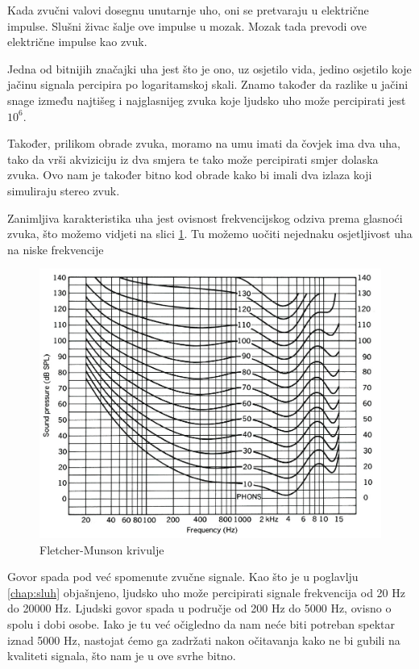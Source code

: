 \documentclass[times, utf8, diplomski]{fer}
\begin{document}
Kada zvučni valovi dosegnu unutarnje uho, oni se pretvaraju u električne impulse. Slušni živac šalje ove impulse u mozak. Mozak tada prevodi ove električne impulse kao zvuk\citep{uho}.

Jedna od bitnijih značajki uha jest što je ono, uz osjetilo vida, jedino osjetilo koje jačinu signala percipira po logaritamskoj skali. Znamo također da razlike u jačini snage između najtišeg i najglasnijeg zvuka koje ljudsko uho može percipirati jest $10^6$.

Također, prilikom obrade zvuka, moramo na umu imati da čovjek ima dva uha, tako da vrši akviziciju iz dva smjera te tako može percipirati smjer dolaska zvuka. Ovo nam je također bitno kod obrade kako bi imali dva izlaza koji simuliraju stereo zvuk.

Zanimljiva karakteristika uha jest ovisnost frekvencijskog odziva prema glasnoći zvuka, što možemo vidjeti na slici \ref{flemu}. Tu možemo uočiti nejednaku osjetljivost uha na niske frekvencije

\begin{figure}[hbt!]
 \centering
 \includegraphics[scale=0.4]{photos/flemu.jpg}
 \caption{Fletcher-Munson krivulje}
 \label{flemu}
\end{figure}
Govor spada pod već spomenute zvučne signale. Kao što je u poglavlju \ref{chap:sluh} objašnjeno, ljudsko uho može percipirati signale frekvencija od 20 Hz do 20000 Hz. Ljudski govor spada u područje od 200 Hz do 5000 Hz, ovisno o spolu i dobi osobe. Iako je tu već očigledno da nam neće biti potreban spektar iznad 5000 Hz, nastojat ćemo ga zadržati nakon očitavanja kako ne bi gubili na kvaliteti signala, što nam je u ove svrhe bitno.
\end{document}
